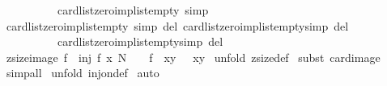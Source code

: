 \begin{isabellebody}
\ \ \ \ \ \ \ \ \ \ card{\isacharunderscore}list{\isacharunderscore}zero{\isacharunderscore}imp{\isacharunderscore}list{\isacharunderscore}empty{}{\isacharbrackleft}\ simp{\isacharbrackright}\isanewline
\isanewline
{}\isamarkupfalse%
\ card{\isacharunderscore}list{\isacharunderscore}zero{\isacharunderscore}imp{\isacharunderscore}list{\isacharunderscore}empty\ {\isacharbrackleft}simp\ del{\isacharbrackright}\ card{\isacharunderscore}list{\isacharunderscore}zero{\isacharunderscore}imp{\isacharunderscore}list{\isacharunderscore}empty{}{\isacharbrackleft}simp\ del{\isacharbrackright}\isanewline
\ \ \ \ \ \ \ \ \ \ card{\isacharunderscore}list{\isacharunderscore}zero{\isacharunderscore}imp{\isacharunderscore}list{\isacharunderscore}empty{}{\isacharbrackleft}simp\ del{\isacharbrackright}\isanewline
\isanewline
\isanewline
{}\isamarkupfalse%
\ zsize{\isacharunderscore}image{\isacharcolon}\ {\isachardoublequoteopen}{\isacharbang}{\isacharbang}f{\isachardot}\ {\isacharbrackleft}{\isacharbar}\ inj\ f{\isacharsemicolon}\ x\ {\isacharcolon}{\isacharpercent}N\ {\isacharbar}{\isacharbrackright}\ {\isacharequal}{\isacharequal}{\isachargreater}\ \ {\isacharhash}{\isacharparenleft}f\ {\isacharbackquote}\ {\isacharparenleft}x{\isachardot}{\isachardot}y{\isacharparenright}{\isacharparenright}\ {\isacharequal}\ \ {\isacharhash}{\isacharparenleft}x{\isachardot}{\isachardot}y{\isacharparenright}{\isachardoublequoteclose}\isanewline
%
\isadelimproof
\isanewline
%
\endisadelimproof
%
\isatagproof
{}\isamarkupfalse%
\ {\isacharparenleft}unfold\ zsize{\isacharunderscore}def{\isacharparenright}\isanewline
{}\isamarkupfalse%
\ {\isacharparenleft}subst\ card{\isacharunderscore}image{\isacharparenright}\isanewline
{}\isamarkupfalse%
\ {\isacharparenleft}simp{\isacharunderscore}all{\isacharparenright}\isanewline
{}\isamarkupfalse%
\ {\isacharparenleft}unfold\ inj{\isacharunderscore}on{\isacharunderscore}def{\isacharparenright}\isanewline
{}\isamarkupfalse%
\ auto\isanewline
{}\isamarkupfalse%
%
\endisatagproof
{\isafoldproof}%
%
\isadelimproof
\isanewline
%
\endisadelimproof
%
\isadelimtheory
\isanewline
%
\endisadelimtheory
%
\isatagtheory
{}\isamarkupfalse%
%
\endisatagtheory
{\isafoldtheory}%
%
\isadelimtheory
\isanewline
%
\endisadelimtheory
\end{isabellebody}%
